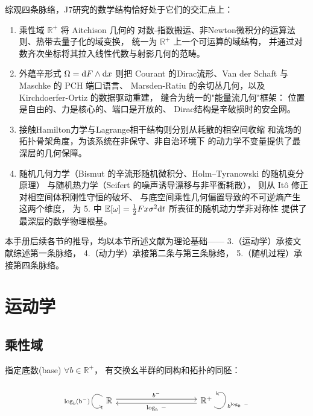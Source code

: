 ﻿\documentclass[10pt,a4paper]{article}
\begin{document}
综观四条脉络，J7研究的数学结构恰好处于它们的交汇点上：
\begin{enumerate}
  \item 乘性域 $\boxed{\mathbb R^+}$ 将 Aitchison 几何的
  对数-指数搬运、非Newton微积分的运算法则、热带去量子化的域变换，
  统一为 $\mathbb R^+$ 上一个可运算的域结构，
  并通过对数齐次坐标将其拉入线性代数与射影几何的范畴。

  \item 外蕴辛形式 $\Omega = \text dF \wedge \text dx$ 则把
  Courant 的Dirac流形、Van der Schaft 与 Maschke 的 PCH 端口语言、
  Marsden-Ratiu 的余切丛几何，以及 Kirchdoerfer-Ortiz 的数据驱动重建，
  缝合为统一的"能量流几何"框架：
  位置是自由的、力是核心的、端口是开放的、
  Dirac结构是辛破损时的安全网。

  \item 接触Hamilton力学与Lagrange相干结构则分别从耗散的相空间收缩
  和流场的拓扑骨架角度，为该系统在非保守、非自治环境下
  的动力学不变量提供了最深层的几何保障。

  \item 随机几何力学（Bismut 的辛流形随机微积分、Holm--Tyranowski 的随机变分原理）
  与随机热力学（Seifert 的噪声诱导漂移与非平衡耗散），
  则从 It\^{o} 修正对相空间体积刚性守恒的破坏、
  与底空间乘性几何偏置导致的不可逆熵产生这两个维度，
  为 5. 中 $\mathbb E[\omega] = \frac{1}{2}Fx\sigma^2 \text dt$
  所表征的随机动力学非对称性
  提供了最深层的数学物理根基。
\end{enumerate}

本手册后续各节的推导，均以本节所述文献为理论基础——
3.（运动学）承接文献综述第一条脉络，
4.（动力学）承接第二条与第三条脉络，
5.（随机过程）承接第四条脉络。

\section{运动学}

\subsection{乘性域}


指定底数(base) $\forall b\in\mathbb R^+$，
有交换幺半群的同构和拓扑的同胚：

$$
\begin{tikzcd}
\mathbb R \arrow[rrrr, "b^-", shift left] \arrow["\text{log}_b(\text b^-)"', loop, distance=2em, in=215, out=145] &  &  &  & \mathbb R^+ \arrow[llll, "\text{log}_b \ -", shift left] \arrow["b^{\text{log}_b \ -}"', loop, distance=2em, in=35, out=325]
\end{tikzcd}
$$
\end{document}

